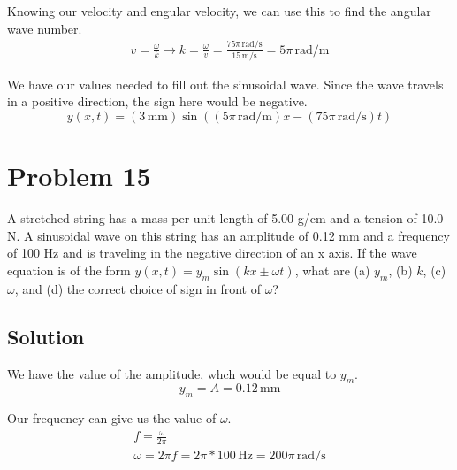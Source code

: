 \documentclass[12pt]{article}
\begin{document}
            Knowing our velocity and engular velocity, we can use this to find the angular wave number.
            \begin{gather}
                v   =   \frac{\omega}{k} \to
                k   =   \frac{\omega}{v}
                    =   \frac{75\pi\,\unit{\radian/\second}}{15\,\unit{\meter/\second}}
                    =   5\pi\,\unit{\radian/\meter}
            \end{gather}

            We have our values needed to fill out the sinusoidal wave.
            Since the wave travels in a positive direction, the sign here would be negative.
            \begin{equation}
                \boxed{y(x,t) = (3\,\unit{\milli\meter})\sin((5\pi\,\unit{\radian/\meter})x - (75\pi\,\unit{\radian/\second})t)}
            \end{equation}

    \section{Problem 15}
        A stretched string has a mass per unit length of 5.00 g/cm and a tension of 10.0 N. 
        A sinusoidal wave on this string has an amplitude of 0.12 mm and a frequency of 100 Hz and is traveling in the negative direction of an x axis. 
        If the wave equation is of the form $y(x, t) = y_m \sin(kx \pm \omega t)$, what are (a) $y_m$, (b) $k$, (c) $\omega$, and (d) the correct choice of sign in front of $\omega$?

        \subsection{Solution}
            We have the value of the amplitude, whch would be equal to $y_m$.
            \begin{equation}
                y_m =   A
                    =   0.12\,\unit{\milli\meter}
            \end{equation}

            Our frequency can give us the value of $\omega$.
            \begin{gather}
                f   =   \frac{\omega}{2\pi}\\
                \omega  =   2\pi f
                    =   2\pi * 100\,\unit{\hertz}
                    =   200\pi\,\unit{\radian/\second}
            \end{gather} 
\end{document}
